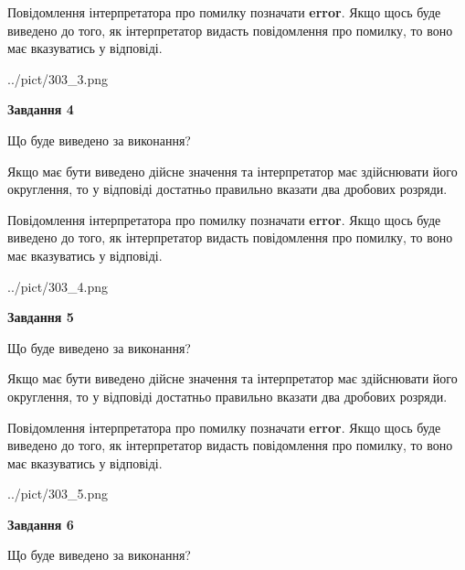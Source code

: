 \documentclass[12pt, ukrainian]{article}
\begin{document}
{\begin {Large}
Повідомлення інтерпретатора про помилку позначати \textbf{error}.
Якщо щось буде виведено до того, як інтерпретатор видасть повідомлення про помилку, 
то воно має вказуватись у відповіді. \par

\begin{center}
	{../pict/303_3.png}
\end{center}
\newpage

{\begin {center}\textbf{Завдання 4}\end {center}}\par
Що буде виведено за виконання? \par

Якщо має бути виведено дійсне значення та інтерпретатор має здійснювати його округлення, 
то у відповіді достатньо правильно вказати два дробових розряди.

Повідомлення інтерпретатора про помилку позначати \textbf{error}.
Якщо щось буде виведено до того, як інтерпретатор видасть повідомлення про помилку, 
то воно має вказуватись у відповіді. \par

\begin{center}
	{../pict/303_4.png}
\end{center}
\newpage

{\begin {center}\textbf{Завдання 5}\end {center}}\par
Що буде виведено за виконання? \par

Якщо має бути виведено дійсне значення та інтерпретатор має здійснювати його округлення, 
то у відповіді достатньо правильно вказати два дробових розряди.

Повідомлення інтерпретатора про помилку позначати \textbf{error}.
Якщо щось буде виведено до того, як інтерпретатор видасть повідомлення про помилку, 
то воно має вказуватись у відповіді. \par

\begin{center}
	{../pict/303_5.png}
\end{center}
\newpage

{\begin {center}\textbf{Завдання 6}\end {center}}\par
Що буде виведено за виконання? \par


\end{Large}}
\end{document}
